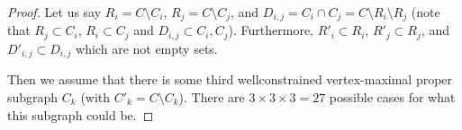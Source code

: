 \documentclass[11pt]{article}
\begin{document}
\begin{proof}
Let us say $R_i=C\setminus C_i$, $R_j=C\setminus C_j$, and $D_{i,j}=C_i\cap C_j=C\setminus R_i\setminus R_j$ (note that $R_j\subset C_i$, $R_i\subset C_j$ and $D_{i,j}\subset C_i,C_j$). Furthermore, $R'_i\subset R_i$, $R'_j\subset R_j$, and $D'_{i,j}\subset D_{i,j}$ which are not empty sets.

Then we assume that there is some third wellconstrained vertex-maximal proper subgraph $C_k$ (with $C'_k=C\setminus C_k$). There are $3\times 3\times 3 = 27$ possible cases for what this subgraph could be.





\end{proof}
\end{document}
